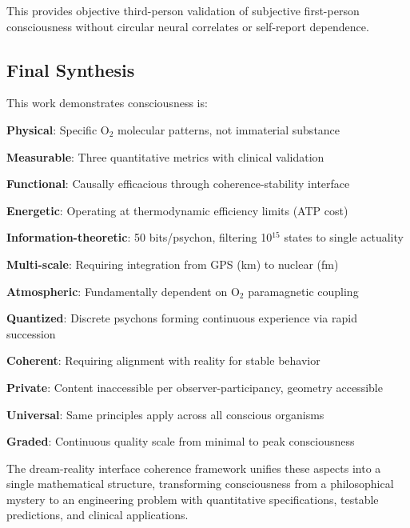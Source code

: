 \documentclass[11pt,onecolumn]{article}
\begin{document}
This provides objective third-person validation of subjective first-person consciousness without circular neural correlates or self-report dependence.


\subsection{Final Synthesis}

This work demonstrates consciousness is:

\textbf{Physical}: Specific O$_2$ molecular patterns, not immaterial substance

\textbf{Measurable}: Three quantitative metrics with clinical validation

\textbf{Functional}: Causally efficacious through coherence-stability interface

\textbf{Energetic}: Operating at thermodynamic efficiency limits (ATP cost)

\textbf{Information-theoretic}: 50 bits/psychon, filtering 10$^{15}$ states to single actuality

\textbf{Multi-scale}: Requiring integration from GPS (km) to nuclear (fm)

\textbf{Atmospheric}: Fundamentally dependent on O$_2$ paramagnetic coupling

\textbf{Quantized}: Discrete psychons forming continuous experience via rapid succession

\textbf{Coherent}: Requiring alignment with reality for stable behavior

\textbf{Private}: Content inaccessible per observer-participancy, geometry accessible

\textbf{Universal}: Same principles apply across all conscious organisms

\textbf{Graded}: Continuous quality scale from minimal to peak consciousness

The dream-reality interface coherence framework unifies these aspects into a single mathematical structure, transforming consciousness from a philosophical mystery to an engineering problem with quantitative specifications, testable predictions, and clinical applications.



\end{document}
